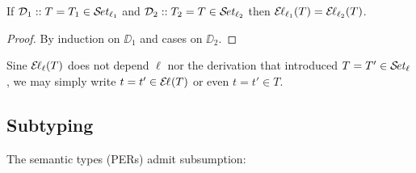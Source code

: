 \documentclass[acmlarge,review,anonymous]{acmart}\settopmatter{printfolios=true}
\begin{document}
\begin{lemma}
\label{lem:indep}
  If $\DD_1 :: T = T_1 \in \SET[\ell_1]$
  and $\DD_2 :: T_2 = T \in \SET[\ell_2]$ then $\EL[\ell_1](T) = \EL[\ell_2](T)$.
\end{lemma}
\begin{proof}
  By induction on $\DD_1$ and cases on $\DD_2$.
\end{proof}
Sine $\EL[\ell](T)$ does not depend $\ell$ nor the derivation that introduced $T = T' \in \SET[\ell]$,  we may simply write $t = t' \in \EL(T)$ or even $t = t' \in T$.


\subsection{Subtyping}
\label{sec:subty}

The semantic types (PERs) admit subsumption:
\end{document}

